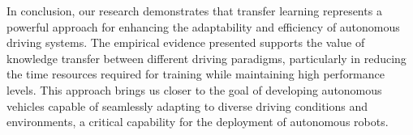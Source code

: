 In conclusion, our research demonstrates that transfer learning represents a powerful approach for enhancing the adaptability and efficiency of autonomous driving systems. The empirical evidence presented supports the value of knowledge transfer between different driving paradigms, particularly in reducing the time resources required for training while maintaining high performance levels. This approach brings us closer to the goal of developing autonomous vehicles capable of seamlessly adapting to diverse driving conditions and environments, a critical capability for the deployment of autonomous robots.

